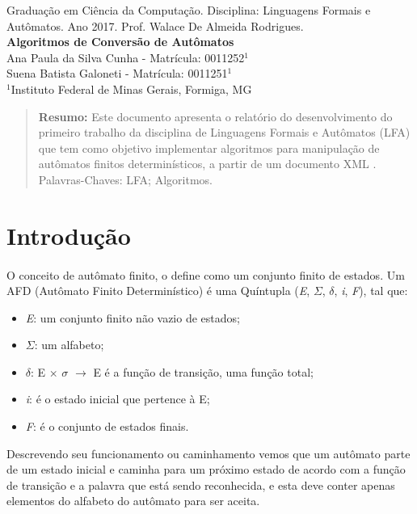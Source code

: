 \documentclass[a4paper,portuguese,12pt]{article}
\begin{document}
\begin{center}
{\footnotesize Graduação em Ciência da Computação. Disciplina: Linguagens Formais e Autômatos. Ano 2017. Prof. Walace De Almeida Rodrigues.}\\[0.5cm]
{\Large \textbf {Algoritmos de Conversão de Autômatos}}\\[0.5cm]
Ana Paula da Silva Cunha - Matrícula: 0011252$^1$\\Suena Batista Galoneti - Matrícula: 0011251$^1$\\
$^1$Instituto Federal de Minas Gerais, Formiga, MG\\[1cm]
\end{center}

\begin{quote}
{\small \textbf{Resumo:} Este documento apresenta o relatório do desenvolvimento do primeiro trabalho da disciplina de Linguagens Formais e Autômatos (LFA) que tem como objetivo implementar algoritmos para manipulação de autômatos finitos determinísticos, a partir de um documento XML .} \\[0.5cm]
{\small Palavras-Chaves: LFA; Algoritmos.}
\end{quote}
	
\section{Introdução}
\paragraph{}O conceito de autômato finito, o define como um conjunto finito de estados. Um AFD (Autômato Finito Determinístico) é uma Quíntupla (\textit{E}, $\Sigma$, $\delta$, \textit{i}, \textit{F}), tal que:
\begin{itemize}
	\item \textit{E}: um conjunto finito não vazio de estados;
	\item $\Sigma$: um alfabeto;
	\item $\delta$: E $\times$ $\sigma$ $\rightarrow$ E é a função de transição, uma função total;
	\item \textit{i}: é o estado inicial que pertence à E;
	\item \textit{F}: é o conjunto de estados finais.
\end{itemize} 

Descrevendo seu funcionamento ou caminhamento vemos que um autômato parte de um estado inicial e caminha para um próximo estado de acordo com a função de transição e a palavra que está sendo reconhecida, e esta deve conter apenas elementos do alfabeto do autômato para ser aceita.
\end{document}
